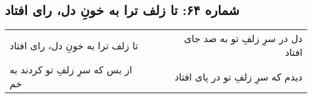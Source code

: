 \begin{center}
\section*{شماره ۶۴: تا زلف ترا به خونِ دل، رای افتاد}
\label{sec:064}
\begin{longtable}{l p{0.5cm} r}
تا زلف ترا به خونِ دل، رای افتاد
&&
دل در سرِ زلفِ تو به صد جای افتاد
\\
از بس که سرِ زلفِ تو کردند به خم
&&
دیدم که سرِ زلفِ تو در پای افتاد
\\
\end{longtable}
\end{center}
